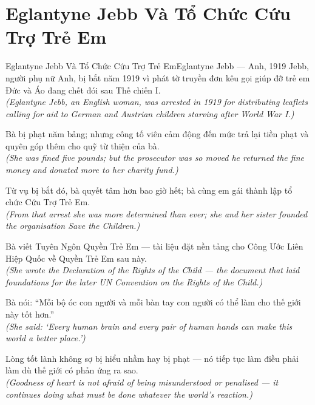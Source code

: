 \section{Eglantyne Jebb Và Tổ Chức Cứu Trợ Trẻ Em}
\begin{truyen}{Eglantyne Jebb Và Tổ Chức Cứu Trợ Trẻ Em}{Eglantyne Jebb --- Anh, 1919}
 Jebb, người phụ nữ Anh, bị bắt năm 1919 vì phát tờ truyền đơn kêu gọi giúp đỡ trẻ em Đức và Áo đang chết đói sau Thế chiến I.\\[4pt]
\textit{(Eglantyne Jebb, an English woman, was arrested in 1919 for distributing leaflets calling for aid to German and Austrian children starving after World War I.)}

Bà bị phạt năm bảng; nhưng công tố viên cảm động đến mức trả lại tiền phạt và quyên góp thêm cho quỹ từ thiện của bà.\\[4pt]
\textit{(She was fined five pounds; but the prosecutor was so moved he returned the fine money and donated more to her charity fund.)}

Từ vụ bị bắt đó, bà quyết tâm hơn bao giờ hết; bà cùng em gái thành lập tổ chức Cứu Trợ Trẻ Em.\\[4pt]
\textit{(From that arrest she was more determined than ever; she and her sister founded the organisation Save the Children.)}

Bà viết Tuyên Ngôn Quyền Trẻ Em --- tài liệu đặt nền tảng cho Công Ước Liên Hiệp Quốc về Quyền Trẻ Em sau này.\\[4pt]
\textit{(She wrote the Declaration of the Rights of the Child --- the document that laid foundations for the later UN Convention on the Rights of the Child.)}

Bà nói: ``Mỗi bộ óc con người và mỗi bàn tay con người có thể làm cho thế giới này tốt hơn.''\\[4pt]
\textit{(She said: `Every human brain and every pair of human hands can make this world a better place.')}

\end{truyen}
\begin{baihoc}
  Lòng tốt lành không sợ bị hiểu nhầm hay bị phạt --- nó tiếp tục làm điều phải làm dù thế giới có phản ứng ra sao.\\[4pt]
  \textit{(Goodness of heart is not afraid of being misunderstood or penalised --- it continues doing what must be done whatever the world's reaction.)}
\end{baihoc}

